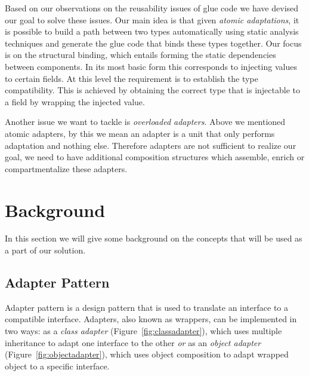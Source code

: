 \documentclass{llncs}
\begin{document}



Based on our observations on the reusability issues of glue code we have devised our goal to solve these issues. Our main idea is that given \emph{atomic adaptations}, it is possible to build a path between two types automatically using static analysis techniques and generate the glue code that binds these types together. Our focus is on the structural binding, which entails forming the static dependencies between components. In its most basic form this corresponds to injecting values to certain fields. At this level the requirement is to establish the type compatibility. This is achieved by obtaining the correct type that is injectable to a field by wrapping the injected value. 

Another issue we want to tackle is \emph{overloaded adapters}. Above we mentioned atomic adapters, by this we mean an adapter is a unit that only performs adaptation and nothing else. Therefore adapters are not sufficient to realize our goal, we need to have additional composition structures which assemble, enrich or compartmentalize these adapters. 


\section{Background}
\label{zamk:sec:bg}
In this section we will give some background on the concepts that will be used as a part of our solution. 

\subsection{Adapter Pattern}
Adapter pattern is a design pattern that is used to translate an interface to a compatible interface. Adapters, also known as wrappers, can be implemented in two ways: as a \emph{class adapter} (Figure~\ref{fig:classadapter}), which uses multiple inheritance to adapt one interface to the other \emph{or} as an \emph{object adapter} (Figure~\ref{fig:objectadapter}), which uses object composition to adapt wrapped object to a specific interface. 
\end{document}
